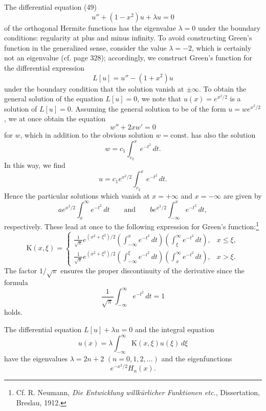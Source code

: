The differential equation (49)
\[
u''+(1-x^2)u+\lambda u=0
\]
of the orthogonal Hermite functions has the eigenvalue $\lambda=0$ under the boundary conditions: regularity at plus and minus infinity. To avoid constructing Green's function in the generalized sense, consider the value $\lambda=-2$, which is certainly not an eigenvalue (cf. page 328); accordingly, we construct Green's function for the differential expression
\[
L[u]=u''-(1+x^2)u
\]
under the boundary condition that the solution vanish at $\pm\infty$. To obtain the general solution of the equation $L[u]=0$, we note that $u(x)=e^{x^2/2}$ is a solution of $L[u]=0$. Assuming the general solution to be of the form $u=we^{x^2/2}$, we at once obtain the equation
\[
w''+2xw'=0
\]
for $w$, which in addition to the obvious solution $w=\mathrm{const.}$ has also the solution
\[
w=c_1\int_{c_2}^{x}e^{-t^2}\,dt.
\]
In this way, we find
\[
u=c_1e^{x^2/2}\int_{c_2}^{x}e^{-t^2}\,dt.
\]
Hence the particular solutions which vanish at $x=+\infty$ and $x=-\infty$ are given by
\[
ae^{x^2/2}\int_x^{\infty}e^{-t^2}\,dt
\qquad\text{and}\qquad
be^{x^2/2}\int_{-\infty}^{x}e^{-t^2}\,dt,
\]
respectively. These lead at once to the following expression for Green's function:\footnote{Cf. R. Neumann, \emph{Die Entwicklung willk\"urlicher Funktionen etc.}, Dissertation, Breslau, 1912.}
\[
\mathrm K(x,\xi)=
\begin{cases}
\displaystyle \frac1{\sqrt\pi}e^{(x^2+\xi^2)/2}\left(\int_{-\infty}^{x}e^{-t^2}\,dt\right)\left(\int_{\xi}^{\infty}e^{-t^2}\,dt\right),&x\le\xi,\\[1.2em]
\displaystyle \frac1{\sqrt\pi}e^{(x^2+\xi^2)/2}\left(\int_{-\infty}^{\xi}e^{-t^2}\,dt\right)\left(\int_{x}^{\infty}e^{-t^2}\,dt\right),&x>\xi.
\end{cases}
\]
The factor $1/\sqrt\pi$ ensures the proper discontinuity of the derivative since the formula
\[
\frac1{\sqrt\pi}\int_{-\infty}^{\infty}e^{-t^2}\,dt=1
\]
holds.

The differential equation $L[u]+\lambda u=0$ and the integral equation
\[
u(x)=\lambda\int_{-\infty}^{\infty}\mathrm K(x,\xi)u(\xi)\,d\xi
\]
have the eigenvalues $\lambda=2n+2$ $(n=0,1,2,\ldots)$ and the eigenfunctions
\[
e^{-x^2/2}H_n(x).
\]

